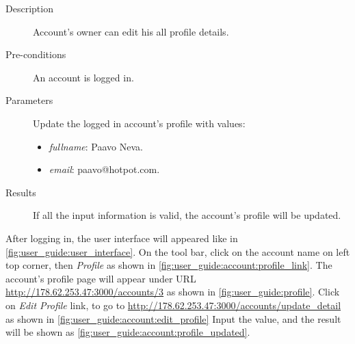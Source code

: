 \begin{description}
\item[Description] Account's owner can edit his all profile details.
\item[Pre-conditions] An account is logged in.
\item[Parameters] Update the logged in account's profile with values:
\begin{itemize}
\item \emph{fullname}: Paavo Neva.
\item \emph{email}: paavo@hotpot.com.
\end{itemize}
\item[Results] If all the input information is valid, the account's profile will be updated.
\end{description}

After logging in, the user interface will appeared like in \autoref{fig:user_guide:user_interface}.
On the tool bar, click on the account name on left top corner, then \emph{Profile} as shown in \autoref{fig:user_guide:account:profile_link}.
The account's profile page will appear under URL \href{http://178.62.253.47:3000/accounts/3}{http://178.62.253.47:3000/accounts/3} as shown in \autoref{fig:user_guide:profile}.
Click on \emph{Edit Profile} link, to go to \href{http://178.62.253.47:3000/accounts/update\_detail}{http://178.62.253.47:3000/accounts/update\_detail} as shown in 
\autoref{fig:user_guide:account:edit_profile}
Input the value, and the result will be shown as \autoref{fig:user_guide:account:profile_updated}.

